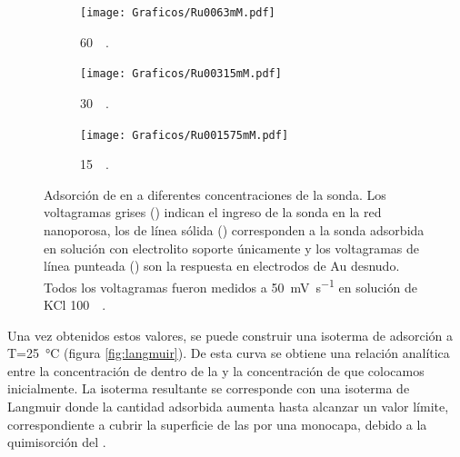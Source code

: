 \begin{figure}[b!]
\begin{subfigure}[t]{0.325\textwidth}
			        	\texttt{[image: Graficos/Ru0063mM.pdf]}
			       		\vspace*{-0.40cm}\caption{\aminorutenio\space \SI{60}{\micro\Molar}.}
			         	\label{fig:Ru0063mM}
			     		\end{subfigure}
		     		\begin{subfigure}[t]{0.325\textwidth}
			        	\texttt{[image: Graficos/Ru00315mM.pdf]}
			       		\vspace*{-0.40cm}\caption{\aminorutenio\space \SI{30}{\micro\Molar}.}
			         	\label{fig:Ru00315mM}
			     		\end{subfigure}
		     		\begin{subfigure}[t]{0.325\textwidth}
			        	\texttt{[image: Graficos/Ru001575mM.pdf]}
			       		\vspace*{-0.40cm}\caption{\aminorutenio\space \SI{15}{\micro\Molar}.}
			         	\label{fig:Ru001575mM}
			     		\end{subfigure}	
		 	   	   	\caption[Preconcentración de \aminorutenio\space en \pdmF]{Adsorción de \ru\space en \pdm\space a diferentes concentraciones de la sonda. Los voltagramas grises (\usebox{\gris}) indican el ingreso de la sonda en la red nanoporosa, los de línea sólida (\usebox{\negro}) corresponden a la sonda adsorbida en solución con electrolito soporte únicamente y los voltagramas de línea punteada (\usebox{\punteado}) son la respuesta en electrodos de Au desnudo. Todos los voltagramas fueron medidos a \SI{50}{\milli\volt\per\second} en solución de KCl \SI{100}{\milli\Molar}.}
		     		\label{fig:preconcentraciones}
		     	   	\end{figure} 	
		Una vez obtenidos estos valores, se puede construir una isoterma de adsorción a T=\SI{25}{\celsius} (figura \ref{fig:langmuir}). De esta curva se obtiene una relación analítica entre la concentración de \ru\space dentro de la \pdm\space y la concentración de \ru\space que colocamos inicialmente. La isoterma resultante se corresponde con una isoterma de Langmuir donde la cantidad adsorbida aumenta hasta alcanzar un valor límite, correspondiente a cubrir la superficie de las \pdm\space por una monocapa, debido a la quimisorción del \ru.\cite{langmuir1918}

